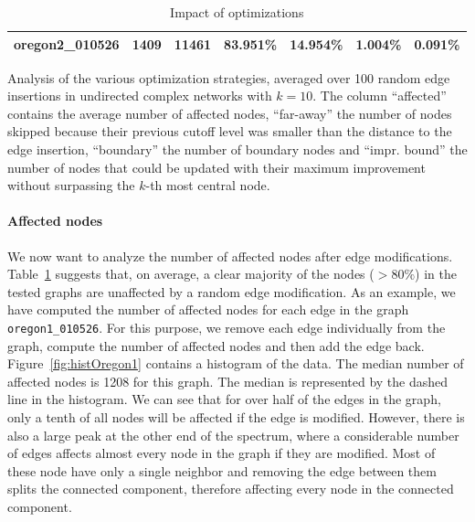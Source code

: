 \begin{table}[h!]
\begin{tabular}{lrrllll}
 oregon2\_010526       &       1409 &   11461 & 83.951\%    & 14.954\%    & 1.004\%        & 0.091\%   \\
\bottomrule
\end{tabular}
\caption{Impact of optimizations}{Analysis of the various optimization strategies, averaged over 100 random edge insertions in undirected complex networks with $k = 10$. The column ``affected'' contains the average number of affected nodes, ``far-away'' the number of nodes skipped because their previous cutoff level was smaller than the distance to the edge insertion, ``boundary'' the number of boundary nodes and ``impr. bound'' the number of nodes that could be updated with their maximum improvement without surpassing the $k$-th most central node.}
\label{tbl:optimizationImpact}
\end{table}

\paragraph{Affected nodes}
We now want to analyze the number of affected nodes after edge modifications. Table~\ref{tbl:optimizationImpact} suggests that, on average, a clear majority of the nodes ($> 80\%$) in the tested graphs are unaffected by a random edge modification. As an example, we have computed the number of affected nodes for each edge in the graph \texttt{oregon1\_010526}. For this purpose, we remove each edge individually from the graph, compute the number of affected nodes and then add the edge back. Figure~\ref{fig:histOregon1} contains a histogram of the data. The median number of affected nodes is 1208 for this graph. The median is represented by the dashed line in the histogram. We can see that for over half of the edges in the graph, only a tenth of all nodes will be affected if the edge is modified. However, there is also a large peak at the other end of the spectrum, where a considerable number of edges affects almost every node in the graph if they are modified. Most of these node have only a single neighbor and removing the edge between them splits the connected component, therefore affecting every node in the connected component.

